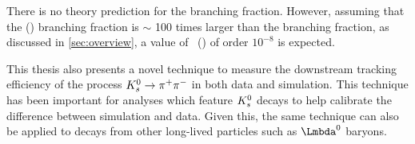 There is no theory prediction for the \Lbpi branching fraction. However, assuming that the \Lb\to\proton\pim\jpsi(\to\mumu) branching fraction is $\sim$ 100 times larger than the \Lbpi branching fraction, as discussed in \autoref{sec:overview}, a value of \BF~(\Lbpi) of order $10^{-8}$ is expected.


This thesis also presents a novel technique to measure the downstream tracking efficiency of the process ${{K}^0_{s}}\rightarrow{\ensuremath{{\pi}^+}}{\ensuremath{{\pi}^-}}$ in both data and simulation. This technique has been important for analyses which feature ${{K}^0_{s}}$ decays to help calibrate the difference between simulation and data. Given this, the same technique can also be applied to decays from other long-lived particles such as $\Lz$ baryons.










